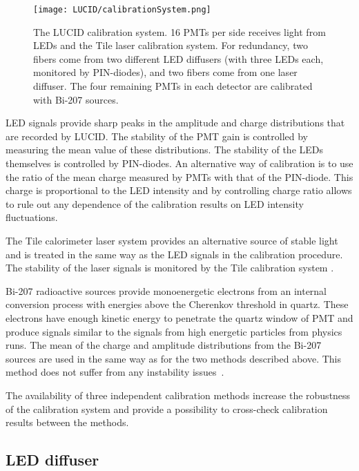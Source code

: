 \begin{figure}
\centering
\texttt{[image: LUCID/calibrationSystem.png]}
\caption{The LUCID calibration system. 16 PMTs per side receives light from LEDs and the Tile laser calibration 
system. 
For redundancy, two fibers come from two different LED diffusers (with three LEDs each, monitored by 
PIN-diodes), and two fibers come from one laser diffuser. The four remaining PMTs in each detector are calibrated 
with Bi-207 sources.}
\label{fig:calibrationSystem}
\end{figure}

LED signals provide sharp peaks in the amplitude and charge distributions that are recorded by LUCID.
The stability of the PMT gain is controlled by measuring the mean value of these distributions. 
The stability of the LEDs themselves is controlled by PIN-diodes.
An alternative way of calibration is to use the ratio of the mean charge measured by PMTs with that of the 
PIN-diode. 
This charge is proportional to the LED intensity and by controlling charge ratio allows to rule out any 
dependence of the calibration results on LED intensity fluctuations.

The Tile calorimeter laser system provides an alternative source of stable light and is treated in the same way
as the LED signals in the calibration procedure. 
The stability of the laser signals is monitored by the Tile calibration system \cite{atlasGeneral}.

Bi-207 radioactive sources provide monoenergetic electrons from an internal conversion process with energies 
above the Cherenkov threshold in quartz. These electrons
have enough kinetic energy to penetrate the quartz window of PMT and produce signals similar to the signals 
from high 
energetic particles from physics runs. The mean of the charge and amplitude 
distributions from the Bi-207 sources are used in the same way as for the two methods described above. 
This method does not suffer from any instability issues~\cite{Alberghi:2016tad}.

The availability of three independent calibration methods increase the robustness of the calibration system 
and provide a possibility to cross-check calibration results between the methods.

\subsection{LED diffuser}
\label{subsec:LEDDiffuser}



